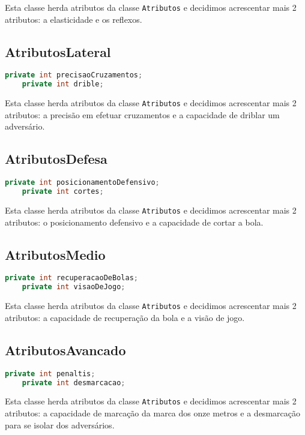 \documentclass[a4paper]{report}
\begin{document}
    Esta classe herda atributos da classe \texttt{Atributos} e decidimos acrescentar mais 2 atributos: a elasticidade e os reflexos.
    
    \subsection{AtributosLateral}
    \begin{lstlisting}[language=Java]
    private int precisaoCruzamentos;
    private int drible;
    \end{lstlisting}

    Esta classe herda atributos da classe \texttt{Atributos} e decidimos acrescentar mais 2 atributos: a precisão em efetuar cruzamentos e a capacidade de driblar um adversário.
	
	\subsection{AtributosDefesa}
    \begin{lstlisting}[language=Java]
    private int posicionamentoDefensivo;
    private int cortes;
    \end{lstlisting}
    
    Esta classe herda atributos da classe \texttt{Atributos} e decidimos acrescentar mais 2 atributos: o posicionamento defensivo e a capacidade de cortar a bola.
        
        
    \subsection{AtributosMedio}
    \begin{lstlisting}[language=Java]
    private int recuperacaoDeBolas;
    private int visaoDeJogo;
    \end{lstlisting}
    
    Esta classe herda atributos da classe \texttt{Atributos} e decidimos acrescentar mais 2 atributos: a capacidade de recuperação da bola e a visão de jogo.
    
    \subsection{AtributosAvancado}
    \begin{lstlisting}[language=Java]
    private int penaltis;
    private int desmarcacao;
    \end{lstlisting}
    
    Esta classe herda atributos da classe \texttt{Atributos} e decidimos acrescentar mais 2 atributos:
    a capacidade de marcação da marca dos onze metros e a desmarcação para se isolar dos adversários.    
\end{document}
